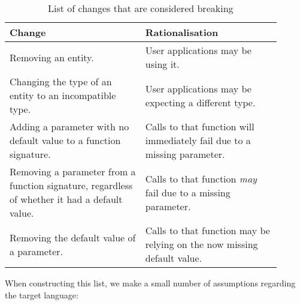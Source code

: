 \documentclass{l4proj}
\begin{document}
\begin{table}[H]
\centering
\begin{tabular}{|p{0.45\linewidth}|p{0.45\linewidth}|}
\hline
\textbf{Change}                                                                               & \textbf{Rationalisation}                                                 \\
\hline
Removing an entity.                                                                           & User applications may be using it.                                       \\
\hline
Changing the type of an entity to an incompatible type.                                       & User applications may be expecting a different type.                     \\
\hline
Adding a parameter with no default value to a function signature.                             & Calls to that function will immediately fail due to a missing parameter. \\
\hline
Removing a parameter from a function signature, regardless of whether it had a default value. & Calls to that function \textit{may} fail due to a missing parameter.     \\
\hline
Removing the default value of a parameter.                                                    & Calls to that function may be relying on the now missing default value.  \\
\hline
\end{tabular}
\caption{List of changes that are considered breaking}
\end{table}

When constructing this list, we make a small number of assumptions
regarding the target language:
\end{document}
